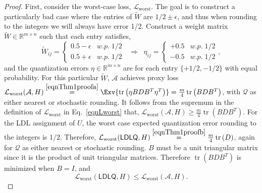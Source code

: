 \begin{proof}
First, consider the worst-case loss, $\mathcal{L}_{\operatorname{worst}}$.
The goal is to construct a particularly bad case where the entries of $\tilde W$ are $1/2 \pm \epsilon$, and thus when rounding to the integers we will always have error 1/2. Construct a weight matrix $\tilde W \in \mathbb{R}^{m \times n}$ such that each entry satisfies,
\[
    \tilde W_{ij} = 
    \begin{cases} 
        0.5 - \epsilon &w.p. \; 1/2 \\ 
        0.5 + \epsilon &w.p. \; 1/2 
    \end{cases}
    \;\;\Rightarrow\;\;
    \eta_{ij}
    =
    \begin{cases} 
        +0.5  &w.p. \; 1/2 \\ 
        -0.5 &w.p. \; 1/2 
    \end{cases},
\]
and the quantization errors $\eta \in \mathbb{R}^{m \times n}$ are for each entry $\{+1/2, -1/2\}$ with equal probability. For this particular $\tilde W$, $\mathcal{A}$ achieves proxy loss $\mathcal{L}_{\operatorname{worst}}(\mathcal{A}, H) \stackrel{\eqref{eqnThm1proofa}}{=} \Exv{ \operatorname{tr}\left( \eta B D B^T \eta^T \right) } = \frac m4 \operatorname{tr}\left( B D B^T \right)$, with $\mathcal{Q}$ as either nearest or stochastic rounding. It follows from the supremum in the definition of $\mathcal{L}_{\operatorname{worst}}$ in Eq.~\eqref{eqnLworst} that, $
    \mathcal{L}_{\operatorname{worst}}(\mathcal{A}, H) \geq \frac m4 \operatorname{tr}\left( B D B^T \right)
$.
For the LDL assignment of $U$, the worst case expected quantization error rounding to the integers is $1/2$. Therefore, $
    \mathcal{L}_{\operatorname{worst}}(\mathsf{LDLQ}, H)
    \stackrel{\eqref{eqnThm1proofb}}{=}
    \frac m4 \operatorname{tr}\left( D \right)
$, again for $\mathcal{Q}$ as either nearest or stochastic rounding. $B$ must be a unit triangular matrix since it is the product of unit triangular matrices. Therefore $\operatorname{tr}\left( B D B^T \right)$ is minimized when $B = I$, and 
\[
    \mathcal{L}_{\operatorname{worst}}(\mathsf{LDLQ}, H) \leq
    \mathcal{L}_{\operatorname{worst}}(\mathcal{A}, H).
\]


\end{proof}
